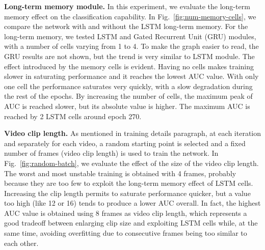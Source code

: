 \noindent\textbf{Long-term memory module.}
In this experiment, we evaluate the long-term memory effect on the classification capability.
In Fig.~\ref{fig:num-memory-cells}, we compare the network with and without the LSTM long-term memory.
For the long-term memory, we tested LSTM and Gated Recurrent Unit (GRU) \cite{chung2014empirical} modules, with a number of cells varying from 1 to 4.
To make the graph easier to read, the GRU results are not shown, but the trend is very similar to LSTM module. 
The effect introduced by the memory cells is evident.
Having no cells makes training slower in saturating performance and it reaches the lowest AUC value.
With only one cell the performance saturates very quickly, with a slow degradation during the rest of the epochs.
By increasing the number of cells, the maximum peak of AUC is reached slower, but its absolute value is higher. The maximum AUC is reached by 2 LSTM cells around epoch 270. 


\noindent\textbf{Video clip length.}
As mentioned in training details paragraph, at each iteration and separately for each video, a random starting point is selected and a fixed number of frames (video clip length) is used to train the network.
In Fig.~\ref{fig:random-batch}, we evaluate the effect of the size of the video clip length.
The worst and most unstable training is obtained with 4 frames, probably because they are too few to exploit the long-term memory effect of LSTM cells. 
Increasing the clip length permits to saturate performance quicker, but a value too high (like 12 or 16) tends to produce a lower AUC overall.
In fact, the highest AUC value is obtained using 8 frames as video clip length, which represents a good tradeoff between enlarging clip size and exploiting LSTM cells while, at the same time, avoiding overfitting due to consecutive frames being too similar to each other.


